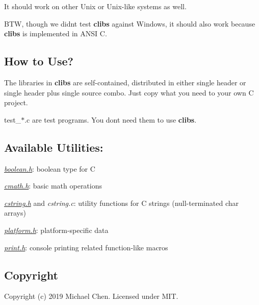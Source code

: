 It should work on other Unix or Unix-\/like systems as well.

B\+TW, though we didn\textquotesingle{}t test {\bfseries clibs} against Windows, it should also work because {\bfseries clibs} is implemented in A\+N\+SI C.

\subsection*{How to Use?}

The libraries in {\bfseries clibs} are self-\/contained, distributed in either single header or single header plus single source combo. Just copy what you need to your own C project.

test\+\_\+$\ast$.c are test programs. You don\textquotesingle{}t need them to use {\bfseries clibs}.

\subsection*{Available Utilities\+:}


\begin{DoxyItemize}
\item {\itshape \hyperlink{boolean_8h}{boolean.\+h}}\+: boolean type for C
\item {\itshape \hyperlink{cmath_8h}{cmath.\+h}}\+: basic math operations
\item {\itshape \hyperlink{cstring_8h_source}{cstring.\+h}} and {\itshape cstring.\+c}\+: utility functions for C strings (null-\/terminated {\ttfamily char} arrays)
\item {\itshape \hyperlink{platform_8h}{platform.\+h}}\+: platform-\/specific data
\item {\itshape \hyperlink{print_8h}{print.\+h}}\+: console printing related function-\/like macros
\end{DoxyItemize}

\subsection*{Copyright}

Copyright (c) 2019 Michael Chen. Licensed under M\+IT. 